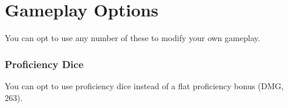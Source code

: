 \documentclass[letterpaper,twocolumn,openany,nodeprecatedcode,bg=print]{dndbook}
\begin{document}







\chapter{Gameplay Options}
\noindent You can opt to use any number of these to modify your own gameplay.

\subsection{Proficiency Dice}
You can opt to use proficiency dice instead of a flat proficiency bonus (DMG, 263).
\end{document}
